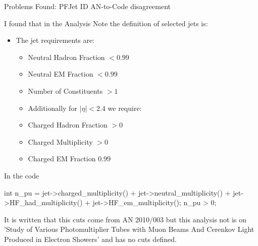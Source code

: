 \documentclass[8pt]{beamer}
\begin{document}
\begin{frame}{Problems Found: PFJet ID AN-to-Code disagreement}
 
I found that in the Analysis Note the definition of selected jets is:

\begin{block}

\begin{itemize}
  \item The jet requirements are:
  \begin{itemize}
    \item Neutral Hadron Fraction $ <0.99 $
    \item Neutral EM Fraction $ <0.99 $
    \item Number of Constituents  $ >1 $
    \item Additionally for $|\eta| < 2.4$ we require:
  \end{itemize}
  \begin{itemize}
    \item Charged Hadron Fraction $ >0 $
    \item Charged Multiplicity $ >0 $
    \item Charged EM Fraction $ 0.99 $
   \end{itemize}
\end{itemize}

\end{block}

\begin{block}{In the code}

int n\_pu = jet->charged\_multiplicity() + jet->neutral\_multiplicity() + jet->HF\_had\_multiplicity() + jet->HF\_em\_multiplicity();
n\_pu > 0;

\end{block}

It is written that this cuts come from AN 2010/003 but this analysis not is on 'Study of Various Photomultiplier Tubes with Muon Beams And Cerenkov Light Produced in Electron Showers' and has no cuts defined.

\end{frame}
\end{document}

